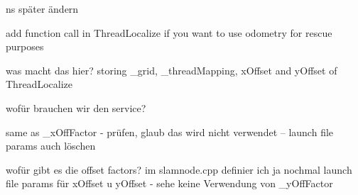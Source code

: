 
\begin{DoxyRefList}
\item[\label{todo__todo000008}%
\hypertarget{todo__todo000008}{}%
Namespace \hyperlink{namespaceohm__tsd__slam__ref}{ohm\-\_\-tsd\-\_\-slam\-\_\-ref} ]ns später ändern  
\item[\label{todo__todo000001}%
\hypertarget{todo__todo000001}{}%
Class \hyperlink{classohm__tsd__slam__ref_1_1OdometryAnalyzer}{ohm\-\_\-tsd\-\_\-slam\-\_\-ref\-:\-:Odometry\-Analyzer} ]add function call in Thread\-Localize if you want to use odometry for rescue purposes  
\item[\label{todo__todo000014}%
\hypertarget{todo__todo000014}{}%
Member \hyperlink{classohm__tsd__slam__ref_1_1SlamNode_abe1e2022599a8ce220de76b142486ea8}{ohm\-\_\-tsd\-\_\-slam\-\_\-ref\-:\-:Slam\-Node\-:\-:\-\_\-localizers} ]was macht das hier? storing \-\_\-grid, \-\_\-thread\-Mapping, x\-Offset and y\-Offset of Thread\-Localize  
\item[\label{todo__todo000015}%
\hypertarget{todo__todo000015}{}%
Member \hyperlink{classohm__tsd__slam__ref_1_1SlamNode_a2941b11fc25f02fad3467297f0260fec}{ohm\-\_\-tsd\-\_\-slam\-\_\-ref\-:\-:Slam\-Node\-:\-:\-\_\-service\-Start\-Stop\-S\-L\-A\-M} ]wofür brauchen wir den service?  
\item[\label{todo__todo000012}%
\hypertarget{todo__todo000012}{}%
Member \hyperlink{classohm__tsd__slam__ref_1_1SlamNode_ad57ec9810293549dc803209a950a776f}{ohm\-\_\-tsd\-\_\-slam\-\_\-ref\-:\-:Slam\-Node\-:\-:\-\_\-x\-Off\-Factor} ]same as \-\_\-x\-Off\-Factor -\/ prüfen, glaub das wird nicht verwendet -- launch file params auch löschen  
\item[\label{todo__todo000013}%
\hypertarget{todo__todo000013}{}%
Member \hyperlink{classohm__tsd__slam__ref_1_1SlamNode_a591fdd2fc92e9fd53112b36f0125cf51}{ohm\-\_\-tsd\-\_\-slam\-\_\-ref\-:\-:Slam\-Node\-:\-:\-\_\-y\-Off\-Factor} ]wofür gibt es die offset factors? im slamnode.\-cpp definier ich ja nochmal launch file params für x\-Offset u y\-Offset -\/ sehe keine Verwendung von \-\_\-y\-Off\-Factor 


\end{DoxyRefList}
